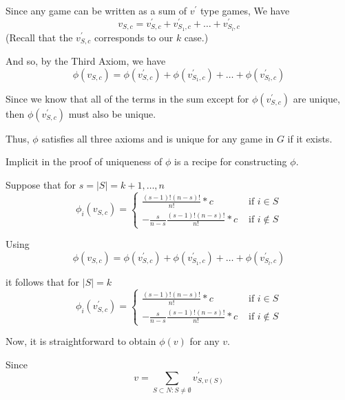 \documentclass[
paper=128mm:96mm, %
fontsize=11pt, %
pagesize, %
parskip=half-, %
]{scrartcl} %
\theoremstyle{mythmstyle} %
\begin{document}
Since any game can be written as a sum of $v^{\prime}$ type games, We have
	\[ v_{S,c} = v^{\prime}_{S,c} + v^{\prime}_{S_{1},c} + \dots + v^{\prime}_{S_{l},c} \]
(Recall that the $v^{\prime}_{S,c}$ corresponds to our $k$ case.)

And so, by the Third Axiom, we have
	\[ \phi(v_{S,c}) = \phi(v^{\prime}_{S,c}) + \phi(v^{\prime}_{S_{1},c}) + \dots + \phi(v^{\prime}_{S_{l},c}) \]
    
Since we know that all of the terms in the sum except for $\phi(v^{\prime}_{S,c})$ are unique, then $\phi(v^{\prime}_{S,c})$ must also be unique.
    
\clearpage

Thus, $\phi$ satisfies all three axioms and is unique for any game in $G$ if it exists.

\clearpage

Implicit in the proof of uniqueness of $\phi$ is a recipe for constructing $\phi$.

Suppose that for $s = |S| = k + 1, \dots, n$
	\[ \phi_{i}(v_{S,c}) = \begin{cases}
                               \frac{(s - 1)!(n - s)!}{n!} * c &\text{ if } i \in S \\
    				           - \frac{s}{n - s} \frac{(s - 1)!(n - s)!}{n!} * c &\text{ if } i \not\in S
                  \end{cases} \]
                  
Using
\[ \phi(v_{S,c}) = \phi(v^{\prime}_{S,c}) + \phi(v^{\prime}_{S_{1},c}) + \dots + \phi(v^{\prime}_{S_{l},c}) \]

it follows that for $|S| = k$
\[ \phi_{i}(v^{\prime}_{S,c}) = \begin{cases}
                               \frac{(s - 1)!(n - s)!}{n!} * c &\text{ if } i \in S \\
    				           - \frac{s}{n - s} \frac{(s - 1)!(n - s)!}{n!} * c &\text{ if } i \not\in S
                  \end{cases} \]

\clearpage

Now, it is straightforward to obtain $\phi(v)$ for any $v$.

Since
	\[ v = \sum_{S \subset N: S \neq \emptyset}{v^{\prime}_{S, v(S)}} \]
\end{document}
